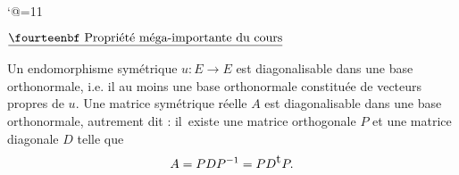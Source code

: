 \catcode`@=11\relax


\vglue-10mm%
\bigskip

%
\bigskip

%
\bigskip

%
\bigskip

%

\bigskip
\centerline{$\underline{\hbox{\fourteenbf Propriété méga-importante du cours}}$}%
\bigskip

\noindent
Un endomorphisme symétrique $u:E\to E$ est diagonalisable dans une base orthonormale, i.e. 
il au moins une base orthonormale constituée de vecteurs propres de $u$. 
\medskip
\noindent
Une matrice symétrique réelle $A$ est diagonalisable dans  une base orthonormale, autrement dit :  il~existe une matrice orthogonale $P$ et une matrice diagonale $D$ telle que 
$$
A=PDP^{-1}=PD^{\hbox{\rm t}}P. 
$$


%
\bigskip

%
\bigskip
\bye